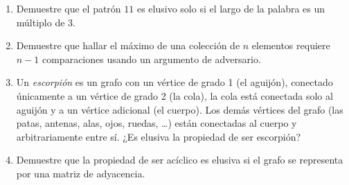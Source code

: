   \begin{enumerate}
  \item
    Demuestre que el patrón \(1 1\) es elusivo
    solo si el largo de la palabra es un múltiplo de \num{3}.
  \item
    Demuestre que hallar el máximo de una colección de \(n\) elementos
    requiere \(n - 1\) comparaciones
    usando un argumento de adversario.
  \item
    Un \emph{escorpión} es un grafo con un vértice de grado \num{1}
    (el aguijón),
    conectado únicamente a un vértice de grado \num{2}
    (la cola),
    la cola está conectada solo al aguijón y a un vértice adicional
    (el cuerpo).
    Los demás vértices del grafo
    (las patas,
     antenas,
     alas,
     ojos,
     ruedas,
     \ldots)
    están conectadas al cuerpo
    y arbitrariamente entre sí.
    ¿Es elusiva la propiedad de ser escorpión?
  \item
    Demuestre que la propiedad de ser acíclico es elusiva
    si el grafo se representa por una matriz de adyacencia.
  \end{enumerate}



